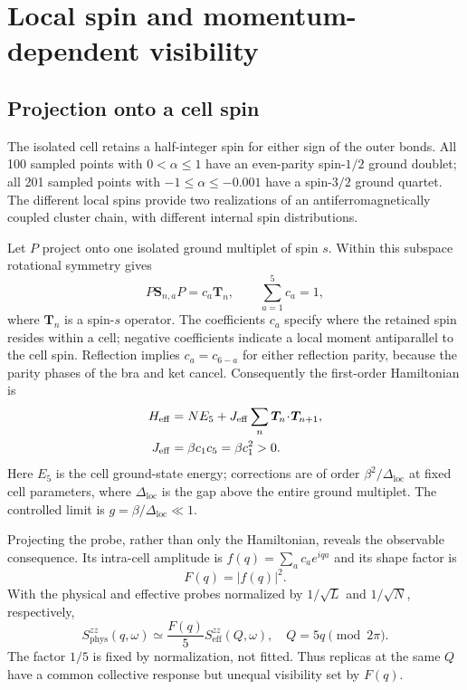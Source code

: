 \section{Local spin and momentum-dependent visibility}
\label{sec:results}
\label{sec:doublet}

\subsection{Projection onto a cell spin}

The isolated cell retains a half-integer spin for either sign of the outer
bonds. All 100 sampled points with $0<\alpha\le1$ have an even-parity
spin-$1/2$ ground doublet; all 201 sampled points with
$-1\le\alpha\le-0.001$ have a spin-$3/2$ ground quartet.
The different local spins provide two realizations of an antiferromagnetically
coupled cluster chain, with different internal spin distributions.

Let $P$ project onto one isolated ground multiplet of spin $s$.
Within this subspace rotational symmetry gives
\begin{equation}
 P\bm S_{n,a}P=c_a\bm T_n,\qquad \sum_{a=1}^5c_a=1,
 \label{eq:projection}
\end{equation}
where $\bm T_n$ is a spin-$s$ operator.
The coefficients $c_a$ specify where the retained spin resides within a cell;
negative coefficients indicate a local moment antiparallel to the cell spin.
Reflection implies $c_a=c_{6-a}$ for either reflection parity, because the
parity phases of the bra and ket cancel.
Consequently the first-order Hamiltonian is
\begin{align}
 H_{\mathrm{eff}}&=NE_5+J_{\mathrm{eff}}\sum_n\bm T_n\!\cdot\!\bm T_{n+1},\notag\\
 J_{\mathrm{eff}}&=\beta c_1c_5=\beta c_1^2>0.
 \label{eq:effective}
\end{align}
Here $E_5$ is the cell ground-state energy; corrections are of order
$\beta^2/\Delta_{\mathrm{loc}}$ at fixed cell parameters, where
$\Delta_{\mathrm{loc}}$ is the gap above the entire ground multiplet.
The controlled limit is $g=\beta/\Delta_{\mathrm{loc}}\ll1$.

Projecting the probe, rather than only the Hamiltonian, reveals the observable
consequence. Its intra-cell amplitude is
$f(q)=\sum_ac_ae^{iqa}$ and its shape factor is
\begin{equation}
 F(q)=|f(q)|^2.
 \label{eq:shape}
\end{equation}
With the physical and effective probes normalized by $1/\sqrt L$ and
$1/\sqrt N$, respectively,
\begin{equation}
 S^{zz}_{\mathrm{phys}}(q,\omega)\simeq
 \frac{F(q)}5 S^{zz}_{\mathrm{eff}}(Q,\omega),
 \quad Q=5q\pmod{2\pi}.
 \label{eq:folded-response}
\end{equation}
The factor $1/5$ is fixed by normalization, not fitted.
Thus replicas at the same $Q$ have a common collective response but unequal
visibility set by $F(q)$.

